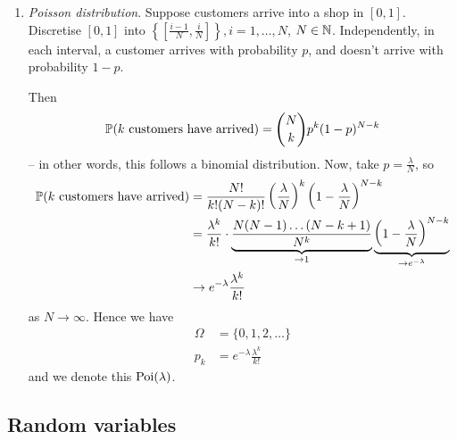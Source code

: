 \documentclass{../../template/note}
\begin{document}
\begin{enumerate}[label=\protect\circled{\arabic*}]
        \begin{align*}
            \Omega &= \{1, 2, \dots\} \\
            p_k &= (1-p)^{k-1}p
        \end{align*}
        Alternatively, we might want to model the probability that we see \(k\) tails before the first heads:
        \begin{align*}
            \Omega &= \{0, 1, \dots\} \\
            p_k' &= (1-p)^kp
        \end{align*}
        \item \emph{Poisson distribution}. Suppose customers arrive into a shop in \([0, 1]\). Discretise \([0, 1]\) into \(\left\{\left[\frac{i-1}{N}, \frac{i}{N}\right]\right\}, i = 1, \dots, N\), \(N \in \mathbb N\). Independently, in each interval, a customer arrives with probability \(p\), and doesn't arrive with probability \(1-p\).
        
        Then
        \begin{align*}
            \mathbb P(k \text{ customers have arrived}) = \binom N k p^k (1-p)^{N-k}
        \end{align*}
        -- in other words, this follows a binomial distribution. Now, take \(p = \frac{\lambda} N\), so
        \begin{align*}
            \mathbb P(k \text{ customers have arrived}) &= \frac{N!}{k!(N-k)!}\left(\frac{\lambda}{N}\right)^k\left(1-\frac{\lambda}{N}\right)^{N-k} \\
            &= \frac{\lambda^k}{k!} \cdot \underbrace{\frac{N(N-1)\dots(N-k+1)}{N^k}}_{\to 1} \underbrace{\left(1-\frac{\lambda}{N}\right)^{N-k}}_{\to e^{-\lambda}} \\
            &\to e^{-\lambda}\frac{\lambda^k}{k!}
        \end{align*}
        as \(N \to \infty\). Hence we have
        \begin{align*}
            \Omega &= \{0, 1, 2, \dots\} \\
            p_k &= e^{-\lambda}\frac{\lambda^k}{k!}
        \end{align*}
        and we denote this \(\operatorname{Poi}(\lambda)\).
    \end{enumerate}
    
    \subsection{Random variables}
\end{document}

